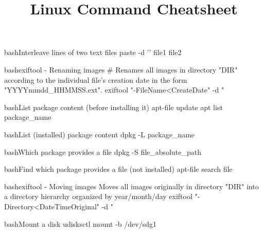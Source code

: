 \documentclass[10pt,a4paper]{article}
\title{\color{w3schools}Linux Command Cheatsheet
}
\begin{document}
\maketitle

\small
\begin{multicols}{3}

\thispagestyle{empty}
\scriptsize



\begin{codebox}{bash}{Interleave lines of two text files}
paste -d '\n' file1 file2

\end{codebox}

\begin{codebox}{bash}{exiftool - Renaming images}
# Renames all images in directory "DIR" according to the individual file's creation date in the form "YYYYmmdd\_HHMMSS.ext".
exiftool "-FileName<CreateDate"
     -d "%

\end{codebox}

\begin{codebox}{bash}{List package content (before installing it)}
apt-file update
apt list package_name

\end{codebox}

\begin{codebox}{bash}{List (installed) package content}
dpkg -L package_name

\end{codebox}

\begin{codebox}{bash}{Which package provides a file}
dpkg -S file_absolute_path

\end{codebox}

\begin{codebox}{bash}{Find which package provides a file (not installed)}
apt-file search file

\end{codebox}

\begin{codebox}{bash}{exiftool - Moving images}
Moves all images originally in directory "DIR" into a directory hierarchy organized by year/month/day
exiftool "-Directory<DateTimeOriginal" -d "%

\end{codebox}

\begin{codebox}{bash}{Mount a disk}
udisksctl mount -b /dev/sdg1


\end{codebox}
\end{multicols}
\end{document}
